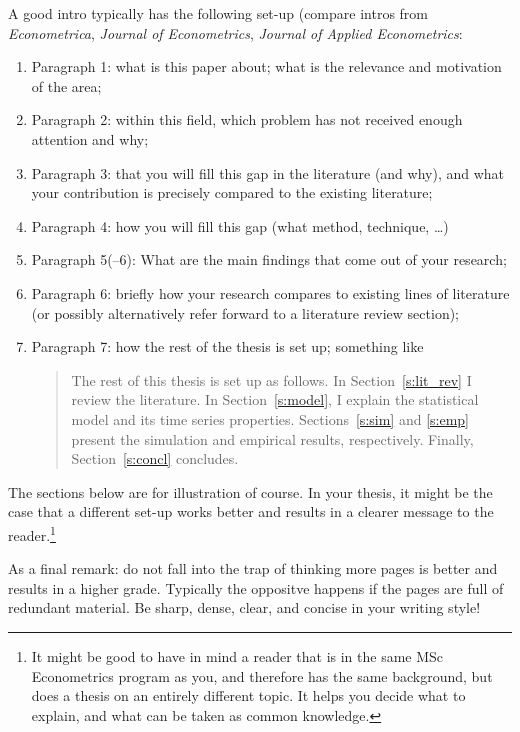 \documentclass[a4paper,12pt]{article}
\begin{document}
A good intro typically has the following set-up (compare intros from \textit{Econometrica}, \textit{Journal of Econometrics}, \textit{Journal of Applied Econometrics}:
\begin{enumerate}
	\item Paragraph 1: what is this paper about; what is the relevance and motivation of the area;
	\item Paragraph 2: within this field, which  problem has not received enough attention and why;
	\item Paragraph 3: that you will fill this gap in the literature (and why), and what your contribution is precisely compared to the existing literature;
	\item Paragraph 4: how you will fill this gap (what method, technique, \ldots)
	\item Paragraph 5(--6): What are the main findings that come out of your research;
	\item Paragraph 6: briefly how your research compares to existing lines of literature (or possibly alternatively refer forward to a literature review section);
	\item Paragraph 7: how the rest of the thesis is set up; something like
	\begin{quotation} \small
	The rest of this thesis is set up as follows. In Section~\ref{s:lit_rev} I review the literature. In Section~\ref{s:model}, I explain the statistical model and its time series properties. Sections~\ref{s:sim} and \ref{s:emp} present the simulation and empirical results, respectively. Finally, Section~\ref{s:concl} concludes.
	\end{quotation}
\end{enumerate}

The sections below are for illustration of course.
In your thesis, it might be the case that a different set-up works better and results in a clearer message to the reader.\footnote{It might be good to have in mind a reader that is in the same MSc Econometrics program as you, and therefore has the same background, but does a thesis on an entirely different topic. It helps you decide what to explain, and what can be taken as common knowledge.}

As a final remark: do not fall into the trap of thinking more pages is better and results in a higher grade. Typically the oppositve happens if the pages are full of redundant material. Be sharp, dense, clear, and concise in your writing style!

\end{document}
